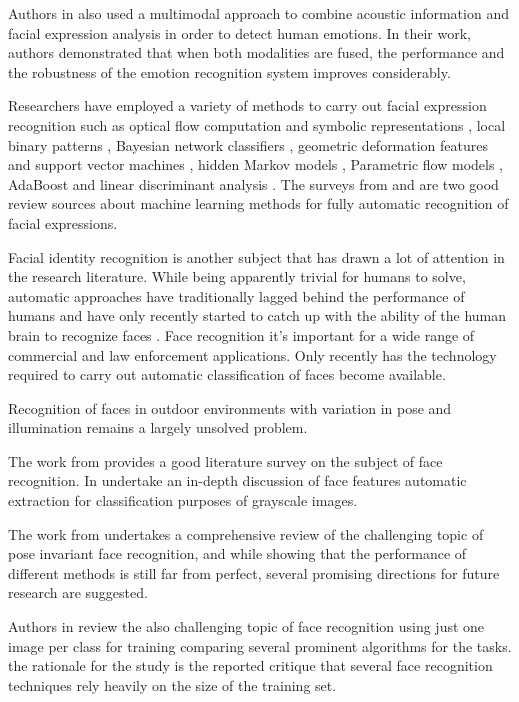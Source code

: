 \documentclass[]{article}
\begin{document}
Authors in \cite{Busso:2004} also used a multimodal approach to combine acoustic information and facial expression
analysis in order to detect human emotions. In their work, authors demonstrated that when both modalities are fused, the performance
and the robustness of the emotion recognition system improves considerably.


Researchers have employed a variety of methods to carry out facial expression recognition such as optical flow
computation  and symbolic representations \cite{Yacoob506414}, local binary patterns \cite{Shan2009803},  Bayesian
network classifiers \cite{Cohen1211408}, geometric deformation features and support vector machines
\cite{kotsia4032815}, hidden Markov models \cite{aleksic1597130, Cohen2003160}, Parametric flow models
\cite{blackAndYacoob}, AdaBoost and linear discriminant analysis \cite{bartlett1398364}. The surveys from
\cite{bartlett1398364} and \cite{Fasel2003259} are two good review sources about machine learning methods 
for fully automatic recognition of facial expressions. 


Facial identity recognition is another subject that has drawn a lot of attention in the research literature. While being
apparently trivial for humans to solve, automatic approaches have traditionally lagged behind the performance of
humans and have only recently started to catch up with the ability of the human brain to recognize faces
\cite{onintelligence, Rozado2012b}. Face recognition it's important  for a wide range of commercial and law enforcement
applications. Only recently has the technology required to carry out automatic classification of faces become
available.

Recognition of faces in outdoor environments with variation in pose and illumination remains a largely unsolved problem.

The work from \cite{Zhao:2003} provides a good literature survey on the subject of face recognition. In
\cite{Craw1987183} undertake an in-depth discussion of face features automatic extraction for classification purposes of
grayscale images.

The work from \cite{Zhang20092876} undertakes a comprehensive review  of the challenging topic of pose invariant face
recognition, and while showing that the performance of different methods is still far from perfect, several promising
directions for future research  are suggested.

Authors in \cite{Tan20061725} review the also challenging topic of face recognition using  just one image per
class for training comparing several prominent algorithms for the tasks. the rationale for the study is the reported
critique that several face recognition techniques rely heavily on the size of the training set.
\end{document}
